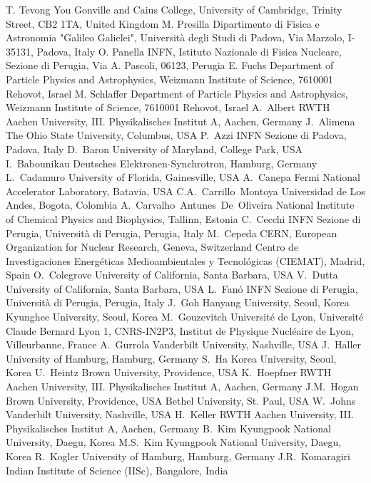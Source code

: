 T. Tevong You {Gonville and Caius College, University of Cambridge, Trinity Street, CB2 1TA, United Kingdom}
M. Presilla {Dipartimento di Fisica e Astronomia "Galileo Galielei", Universit\`{a} degli Studi di Padova, Via Marzolo, I-35131, Padova, Italy} 
O. Panella {INFN, Istituto Nazionale di Fisica Nucleare, Sezione di Perugia, Via A. Pascoli, 06123, Perugia}
E. Fuchs {Department of Particle Physics and Astrophysics, Weizmann Institute of Science, 7610001 Rehovot, Israel}
M. Schlaffer {Department of Particle Physics and Astrophysics, Weizmann Institute of Science, 7610001 Rehovot, Israel}
A.~Albert {RWTH Aachen University, III. Physikalisches Institut A, Aachen, Germany}
J.~Alimena {The Ohio State University, Columbus, USA}
P.~Azzi {INFN Sezione di Padova, Padova, Italy}
D.~Baron {University of Maryland, College Park, USA}
I.~Babounikau {Deutsches Elektronen-Synchrotron, Hamburg, Germany}
L.~Cadamuro {University of Florida, Gainesville, USA}
A.~Canepa {Fermi National Accelerator Laboratory, Batavia, USA}
C.A.~Carrillo~Montoya {Universidad de Los Andes, Bogota, Colombia}
A.~Carvalho~Antunes~De~Oliveira {National Institute of Chemical Physics and Biophysics, Tallinn, Estonia}
C.~Cecchi {INFN Sezione di Perugia, Universit\`{a} di Perugia, Perugia, Italy}
M.~Cepeda {CERN, European Organization for Nuclear Research, Geneva, Switzerland} {Centro de Investigaciones Energ\'{e}ticas Medioambientales y Tecnol\'{o}gicas (CIEMAT), Madrid, Spain}
O.~Colegrove {University of California, Santa Barbara, USA}
V.~Dutta {University of California, Santa Barbara, USA}
L.~Fan\'{o} {INFN Sezione di Perugia, Universit\`{a} di Perugia, Perugia, Italy}
J.~Goh {Hanyang University, Seoul, Korea} {Kyunghee University, Seoul, Korea}
M.~Gouzevitch {Universit\'{e} de Lyon, Universit\'{e} Claude Bernard Lyon 1, CNRS-IN2P3, Institut de Physique Nucl\'{e}aire de Lyon, Villeurbanne, France}
A.~Gurrola {Vanderbilt University, Nashville, USA}
J.~Haller {University of Hamburg, Hamburg, Germany}
S.~Ha {Korea University, Seoul, Korea}
U.~Heintz {Brown University, Providence, USA}
K.~Hoepfner {RWTH Aachen University, III. Physikalisches Institut A, Aachen, Germany}
J.M.~Hogan {Brown University, Providence, USA} {Bethel University, St. Paul, USA}
W.~Johns {Vanderbilt University, Nashville, USA}
H.~Keller {RWTH Aachen University, III. Physikalisches Institut A, Aachen, Germany}
B.~Kim {Kyungpook National University, Daegu, Korea}
M.S.~Kim {Kyungpook National University, Daegu, Korea}
R.~Kogler {University of Hamburg, Hamburg, Germany}
J.R.~Komaragiri {Indian Institute of Science (IISc), Bangalore, India}
